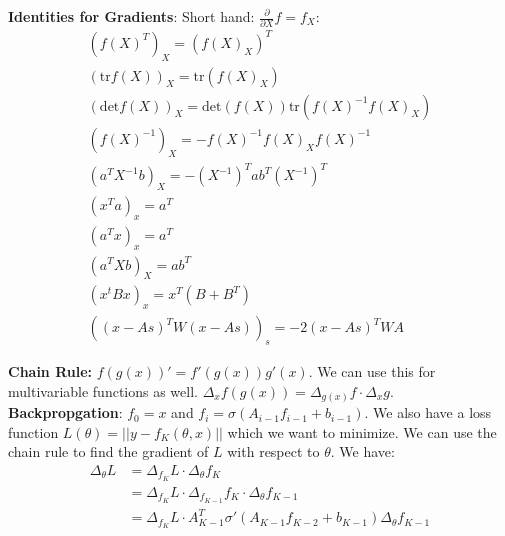 \documentclass[answers,12pt,addpoints]{exam}
\begin{document}
\textbf{Identities for Gradients}: Short hand: $\frac{\partial}{\partial X} f = f_X$:
\begin{align*}
    (f(X)^T)_X = (f(X)_X)^T \\
    (\text{tr}f(X))_X = \text{tr}(f(X)_X) \\
    (\text{det}f(X))_X = \text{det}(f(X))\text{tr}(f(X)^{-1} f(X)_X) \\
    (f(X)^{-1})_X = -f(X)^{-1} f(X)_X f(X)^{-1} \\
    (a^T X^{-1}b)_X = -(X^{-1})^T ab^T (X^{-1})^T\\
    (x^T a)_x = a^T \\
    (a^T x)_x = a^T\\
    (a^T X b)_X = ab^T \\
    (x^t B x)_x = x^T(B + B^T)\\
    ((x-As)^T W (x-As))_s = -2(x-As)^T W A 
\end{align*}

\textbf{Chain Rule:} $f(g(x))'  = f'(g(x))g'(x)$. We can use this for multivariable functions as well. $\Delta_x f(g(x)) = \Delta_{g(x)} f \cdot \Delta_x g$.\\

\textbf{Backpropgation}: $f_0 =x$ and $f_i = \sigma(A_{i-1}f_{i-1} + b_{i-1})$. We also have a loss function $L(\theta) = ||y - f_K(\theta, x)||$ which we want to minimize. We can use the chain rule to find the gradient of $L$ with respect to $\theta$. We have:
\begin{align*}
    \Delta_{\theta} L &= \Delta_{f_K} L \cdot \Delta_{\theta} f_K \\
    &= \Delta_{f_K} L \cdot \Delta_{f_{K-1}} f_K \cdot \Delta_{\theta} f_{K-1} \\
    &= \Delta_{f_K} L \cdot A_{K-1}^T \sigma'(A_{K-1}f_{K-2} + b_{K-1})\Delta_{\theta} f_{K-1}
\end{align*}
\begin{example}
    
\end{example}
\end{document}
